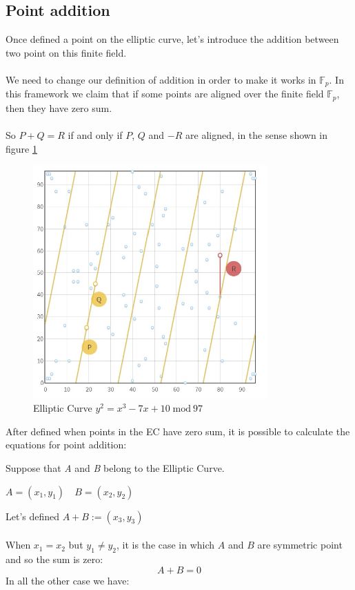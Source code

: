 \subsection{Point addition}
Once defined a point on the elliptic curve, let's introduce the addition between two point on this finite field.
\\ \\
We need to change our definition of addition in order to make it works in $\mathbb{F}_p$. In this framework we claim that if some points are aligned over the finite field $\mathbb{F}_p$, then they have zero sum.
\\ \\
So $P+Q=R$ if and only if $P$, $Q$ and $-R$ are aligned, in the sense shown in figure \ref{fig:EC_aligned}
\begin{figure}[ht!]
	\centering
	\includegraphics[width=9cm]{Figures/EC_aligned.jpg}
	\caption{Elliptic Curve $y^2=x^3-7x+10 \; \textrm{mod} \ 97$}
	\label{fig:EC_aligned}
\end{figure}

\begin{flushleft}
	After defined when points in the EC have zero sum, it is possible to calculate the equations for point addition:
\end{flushleft}
Suppose that \textit{A} and \textit{B} belong to the Elliptic Curve.

\begin{center}
	$ A=(x_1,y_1) \quad B=(x_2,y_2)$
\end{center}
Let's defined $ A+B :=(x_3,y_3) $ 
\\ \\
When $x_1=x_2$ but $y_1 \neq y_2$, it is the case in which $A$ and $B$ are symmetric point and so the sum is zero: 
\begin{equation*}
A+B=0
\end{equation*}
In all the other case we have:



